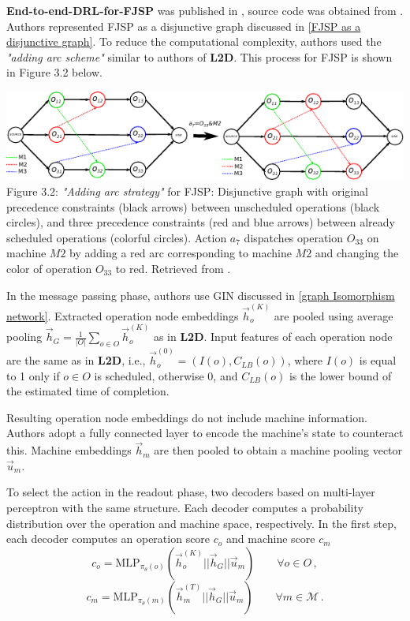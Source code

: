 \textbf{End-to-end-DRL-for-FJSP} was published in \cite{LEI2022117796}, source code was obtained from \cite{github_end_to_end_drl_for_fjsp}. Authors represented FJSP as a disjunctive graph discussed in \ref{FJSP as a disjunctive graph}. To reduce the computational complexity, authors used the \textit{"adding arc scheme"} similar to authors of \textbf{L2D}. This process for FJSP is shown in Figure 3.2 below.
\begin{center}
    \includegraphics[width=\linewidth]{images/fjsp_adding_arcs.pdf}\\
    Figure 3.2: \textit{"Adding arc strategy"} for FJSP: Disjunctive graph with original precedence constraints (black arrows) between unscheduled operations (black circles), and three precedence constraints (red and blue arrows) between already scheduled operations (colorful circles). Action $a_7$ dispatches operation $O_{33}$ on machine $M2$ by adding a red arc corresponding to machine $M2$ and changing the color of operation $O_{33}$ to red. Retrieved from \cite{LEI2022117796}.
\end{center}
In the message passing phase, authors use GIN discussed in \ref{graph Isomorphism network}. Extracted operation node embeddings $\vec{h}_o^{(K)}$ are pooled using average pooling $\vec{h}_G = \frac{1}{|O|} \sum_{o \in O} \vec{h}_o^{(K)}$ as in \textbf{L2D}. Input features of each operation node are the same as in \textbf{L2D}, i.e., $\vec{h}_o^{(0)} = (I(o), C_{LB}(o))$, where $I(o)$ is equal to 1 only if $o \in O$ is scheduled, otherwise 0, and $C_{LB}(o)$ is the lower bound of the estimated time of completion.
\par
Resulting operation node embeddings do not include machine information. Authors adopt a fully connected layer to encode the machine's state to counteract this. Machine embeddings $\vec{h}_m$ are then pooled to obtain a machine pooling vector $\vec{u}_m$. 
\par
To select the action in the readout phase, two decoders based on multi-layer perceptron with the same structure. Each decoder computes a probability distribution over the operation and machine space, respectively. In the first step, each decoder computes an operation score $c_o$ and machine score $c_m$ \cite{LEI2022117796}
\begin{equation}
    c_o = \text{MLP}_{\pi_{\theta}(o)} \left ( \vec{h}_o^{(K)} || \vec{h}_G || \vec{u}_m \right ) \hspace{2em} \forall o \in O \, ,
\end{equation}
\begin{equation}
    c_m = \text{MLP}_{\pi_{\theta}(m)} \left ( \vec{h}_m^{(T)} || \vec{h}_G || \vec{u}_m \right ) \hspace{2em} \forall m \in \mathcal{M} \, .
\end{equation}
